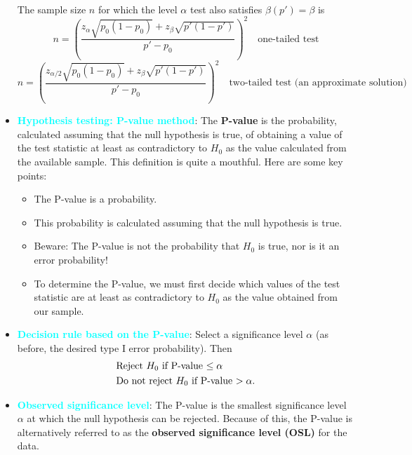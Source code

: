 \documentclass{report}
\begin{document}
\begin{itemize}
\[\begin{array}{ll}
                \end{array}
            \]
            \bigbreak \noindent 
            The sample size \( n \) for which the level \( \alpha \) test also satisfies \( \beta(p') = \beta \) is
            \bigbreak \noindent 
            \[
                n = \left( \frac{z_\alpha \sqrt{p_0(1 - p_0)} + z_\beta \sqrt{p'(1 - p')}}{p' - p_0} \right)^2 \quad \text{one-tailed test}
            \]
            \bigbreak \noindent 
            \[
                n = \left( \frac{z_{\alpha/2} \sqrt{p_0(1 - p_0)} + z_\beta \sqrt{p'(1 - p')}}{p' - p_0} \right)^2 \quad \text{two-tailed test (an approximate solution)}
            \]
            \item \textbf{\textcolor{cyan}{Hypothesis testing: P-value method}}:
                The \textbf{P-value} is the probability, calculated assuming that the null hypothesis is true, of obtaining a value of the test statistic at least as contradictory to $H_{0}$ as the value calculated from the available sample.
                \bigbreak \noindent 
                This definition is quite a mouthful. Here are some key points:
                \begin{itemize}
                    \item The P-value is a probability.
                    \item This probability is calculated assuming that the null hypothesis is true.
                    \item Beware: The P-value is not the probability that $H_{0}$ is true, nor is it an error probability!
                    \item To determine the P-value, we must first decide which values of the test statistic are at least as contradictory to $H_{0}$ as the value obtained from our sample.
                \end{itemize}
        \item \textbf{\textcolor{cyan}{Decision rule based on the P-value}}:
            Select a significance level $\alpha $ (as before, the desired type I error probability). Then
            \begin{align*}
                &\text{Reject $H_{0}$ if P-value $ \leq \alpha$} \\
                &\text{Do not reject $H_{0}$ if P-value $ > \alpha$} 
            .\end{align*}
        \item \textbf{\textcolor{cyan}{Observed significance level}}:
            The P-value is the smallest significance level $\alpha$ at which the null hypothesis can be rejected. Because of this, the P-value is alternatively referred to as the \textbf{observed significance level (OSL)} for the data.

\end{itemize}
\end{document}
